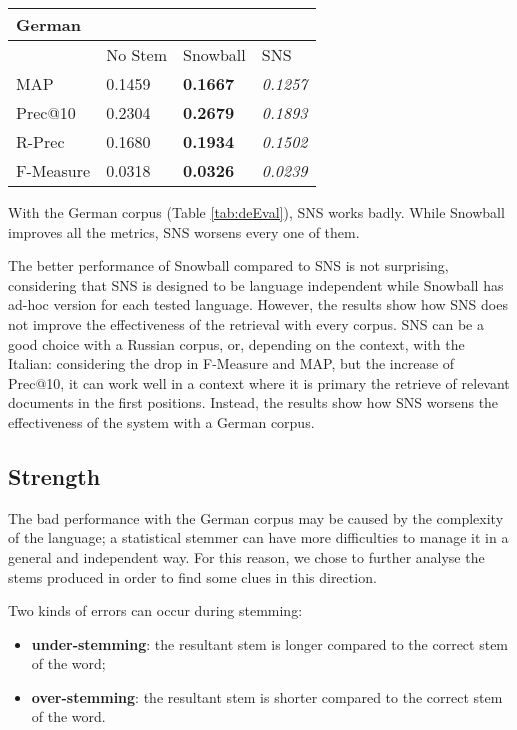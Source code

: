 \begin{center}
   \begin{tabular}{| l | l | l | l |}
    \hline
    \multicolumn{4}{|l|}{\textbf{German}}\\ \hline
    & No Stem & Snowball & SNS\\ \hline
    MAP & 0.1459 & \textbf{0.1667} & \textit{0.1257} \\ \hline
    Prec@10 & 0.2304 & \textbf{0.2679} & \textit{0.1893} \\ \hline
    R-Prec & 0.1680 & \textbf{0.1934} & \textit{0.1502}\\ \hline
    F-Measure & 0.0318 & \textbf{0.0326} & \textit{0.0239}\\ \hline    
    \end{tabular}
    \label{tab:deEval}
\end{center}

With the German corpus (Table \ref{tab:deEval}), SNS works badly. While Snowball improves all the metrics, SNS worsens every one of them.

The better performance of Snowball compared to SNS is not surprising, considering that SNS is designed to be language independent while Snowball has ad-hoc version for each tested language. However, the results show how SNS does not improve the effectiveness of the retrieval with every corpus. SNS can be a good choice with a Russian corpus, or, depending on the context, with the Italian: considering the drop in F-Measure and MAP, but the increase of Prec@10, it can work well in a context where it is primary the retrieve of relevant documents in the first positions. Instead, the results show how SNS worsens the effectiveness of the system with a German corpus. 

\subsection{Strength}
The bad performance with the German corpus may be caused by the complexity of the language; a statistical stemmer can have more difficulties to manage it in a general and independent way. For this reason, we chose to further analyse the stems produced in order to find some clues in this direction.

Two kinds of errors can occur during stemming:

\begin{itemize}
\item \textbf{under-stemming}: the resultant stem is longer compared to the correct stem of the word;
\item \textbf{over-stemming}: the resultant stem is shorter compared to the correct stem of the word.
\end{itemize}

